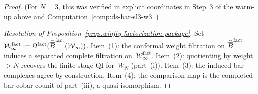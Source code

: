 \begin{proof}
(For $N = 3$, this was verified
in explicit coordinates in Step~3 of the warm-up above and
Computation~\ref{comp:ds-bar-sl3-w3}.)

\emph{Resolution of
Proposition~\textup{\ref{prop:winfty-factorization-package}}.}
Set $\mathcal{W}^{\mathrm{fact}}_\infty :=
\Omega^{\mathrm{fact}}(
\widehat{\overline{B}}^{\mathrm{fact}}(\mathcal{W}_\infty))$.
Item~(1): the conformal weight filtration on
$\widehat{\overline{B}}^{\mathrm{fact}}$ induces a separated complete
filtration on~$\mathcal{W}^{\mathrm{fact}}_\infty$.
Item~(2): quotienting by weight $> N$ recovers the finite-stage
QI for~$W_N$ (part~(i)).
Item~(3): the induced bar complexes agree by construction.
Item~(4): the comparison map is the completed bar-cobar
counit of part~(iii), a quasi-isomorphism.
\end{proof}

